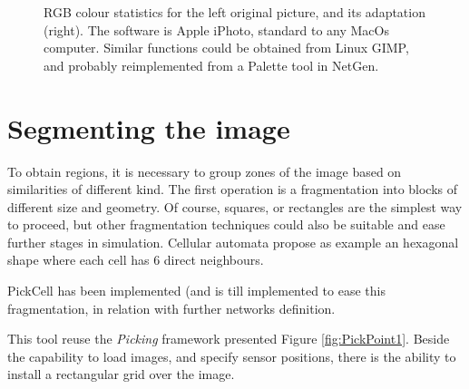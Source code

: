 \begin{figure}[hbtp]
\begin{center}
\begin{minipage}{6cm}
\begin{center}
\end{center}
\end{minipage}
\caption{RGB colour statistics for the left original picture, and its adaptation (right). The software
is Apple iPhoto, standard to any MacOs computer. Similar functions could be obtained from Linux GIMP,
and probably reimplemented from a Palette tool in NetGen.}
\label{fig:colours1+2}
\end{center}
\end{figure}
  
\section { Segmenting the image}

To obtain regions, it is necessary to group zones of the image based on similarities of different kind.
The first operation is a fragmentation into blocks of different size and geometry. Of course,
squares, or rectangles are the simplest way to proceed, but other fragmentation techniques could also
be suitable and ease further stages in simulation. Cellular automata propose as example  an hexagonal
shape where each cell has 6 direct neighbours.

{\sc PickCell} has been implemented (and is till implemented to ease this fragmentation, in relation with 
further networks definition.

This tool reuse the {\sl Picking} framework presented Figure  \ref{fig:PickPoint1}. Beside the capability
to load images, and specify sensor positions, there is the ability to install a rectangular grid over the
image.



